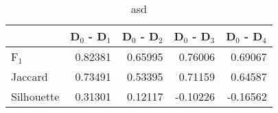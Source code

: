 \begin{table}
\centering
\caption{asd}
\label{asd}
\begin{tabular}{lrrrr}
\toprule
{} &  D$_0$ - D$_1$ &  D$_0$ - D$_2$ &  D$_0$ - D$_3$ &  D$_0$ - D$_4$ \\
\midrule
F$_1$      &        0.82381 &        0.65995 &        0.76006 &        0.69067 \\
Jaccard    &        0.73491 &        0.53395 &        0.71159 &        0.64587 \\
Silhouette &        0.31301 &        0.12117 &       -0.10226 &       -0.16562 \\
\bottomrule
\end{tabular}
\end{table}
